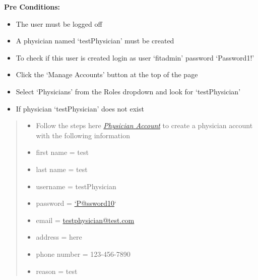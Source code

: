 \documentclass[letterpaper,10pt,english]{sphinxmanual}
\begin{document}
\textbf{Pre Conditions:}
\begin{itemize}
\item {} 
The user must be logged off

\item {} 
A physician named `testPhysician' must be created

\end{itemize}
\begin{itemize}
\item {} 
To check if this user is created login as user `fitadmin' password `Password1!'

\item {} 
Click the `Manage Accounts' button at the top of the page

\item {} 
Select `Physicians' from the Roles dropdown and look for `testPhysician'

\end{itemize}
\begin{itemize}
\item {} 
If physician `testPhysician' does not exist

\end{itemize}
\begin{quote}
\begin{itemize}
\item {} 
Follow the steps here {\hyperref[user_guide/account_creation:create-physician-account]{\emph{Physician Account}}} to create a physician account with the following information

\end{itemize}
\begin{itemize}
\item {} 
first name = test

\item {} 
last name = test

\item {} 
username = testPhysician

\item {} 
password = \href{mailto:'P@ssword10}{`P@ssword10}`

\item {} 
email = \href{mailto:testphysician@test.com}{testphysician@test.com}

\item {} 
address = here

\item {} 
phone number = 123-456-7890

\item {} 
reason = test

\end{itemize}
\end{quote}
\end{document}
